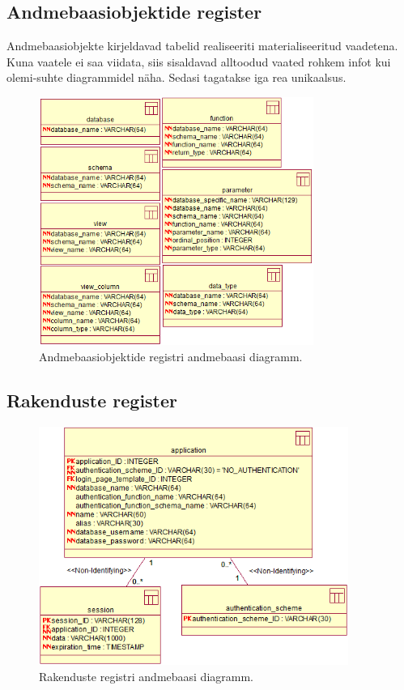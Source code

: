 \documentclass[a4paper,12pt]{article} %
\begin{document}
\subsection*{Andmebaasiobjektide register}
Andmebaasiobjekte kirjeldavad tabelid realiseeriti materialiseeritud vaadetena. Kuna vaatele ei saa viidata, siis sisaldavad alltoodud vaated rohkem infot kui olemi-suhte diagrammidel näha. Sedasi tagatakse iga rea unikaalsus.
\begin{figure}[H]
\centering
\includegraphics[width=0.8\textwidth]{./diagrams/database-object-db-diagram.png}
\caption{Andmebaasiobjektide registri andmebaasi diagramm.}
\label{fig_andmebaasiobjektide_registri_andmebaasi_diagramm}
\end{figure}

\subsection*{Rakenduste register}
\begin{figure}[H]
\centering
\includegraphics[width=0.9\textwidth]{./diagrams/applications-db-diagram.png}
\caption{Rakenduste registri andmebaasi diagramm.}
\label{fig_rakenduste_registri_andmebaasi_diagramm}
\end{figure}
\end{document}
